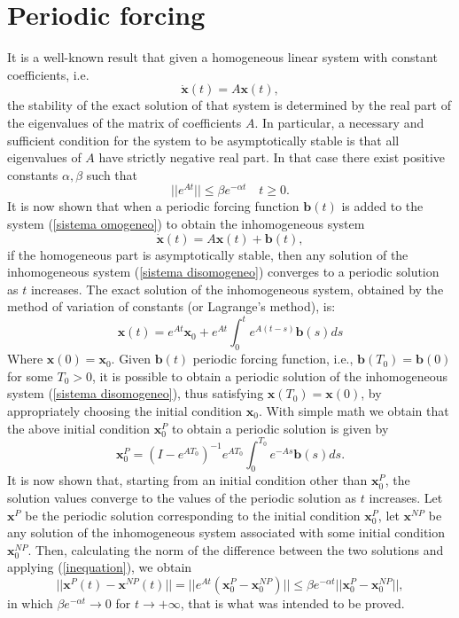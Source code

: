 \section{Periodic forcing}
It is a well-known result that given a homogeneous linear system with constant coefficients, i.e.
\begin{equation}\label{sistema omogeneo}
    \bm{\dot{x}}(t)=A\bm{x}(t),
\end{equation}
the stability of the exact solution of that system is determined by the real part of the eigenvalues of the matrix of coefficients $A$. In particular, a necessary and sufficient condition for the system to be asymptotically stable is that all eigenvalues of $A$ have strictly negative real part. In that case there exist positive constants $\alpha, \beta$ such that
\begin{equation}\label{inequation}
||e^{At}||\leq \beta e^{-\alpha t}\quad t\geq 0.    
\end{equation}
It is now shown that when a periodic forcing function $\bm{b}(t)$ is added to the system (\ref{sistema omogeneo}) to obtain the
inhomogeneous system 
\begin{equation}\label{sistema disomogeneo}
    \bm{\dot{x}}(t)=A\bm{x}(t)+\bm{b}(t),
\end{equation}
if the homogeneous part is asymptotically stable, then any solution of the inhomogeneous system (\ref{sistema disomogeneo}) converges to a periodic solution as $t$ increases. The exact solution of the inhomogeneous system, obtained by the method of variation of constants (or Lagrange's method), is:
\[
\bm{x}(t)=e^{At}\bm{x}_0+e^{At}\int_0^t e^{A(t-s)}\bm{b}(s)ds
\]
Where $\bm{x}(0)= \bm{x}_0$. Given $\bm{b}(t)$ periodic forcing function, i.e., $\bm{b}(T_0) = \bm{b}(0)$ for some $T_0 > 0$, it is possible to obtain a periodic solution of the inhomogeneous system (\ref{sistema disomogeneo}), thus satisfying $\bm{x}(T_0) = \bm{x}(0)$, by appropriately choosing the initial condition $\bm{x}_0$. With simple math we obtain that the above initial condition $\bm{x}^P_0$ to obtain a periodic solution is given by
\[
\bm{x}_0^P=(I-e^{AT_0})^{-1} e^{AT_0}\int_0^{T_0} e^{-As}\bm{b}(s)ds.
\]
It is now shown that, starting from an initial condition other than $\bm{x}^P_0$, the solution values converge to the values of the periodic solution as $t$ increases. Let $\bm{x}^P$ be the periodic solution corresponding to the initial condition $\bm{x}^P_0$, let $\bm{x}^{NP}$ be any solution of the inhomogeneous system associated with some initial condition $\bm{x}_0^{NP}$. Then, calculating the norm of the difference between the two solutions and applying (\ref{inequation}), we obtain
\[
||\bm{x}^P(t)-\bm{x}^{NP}(t)||=||e^{At}(\bm{x}_0^P-\bm{x}_0^{NP})||\leq \beta e^{-\alpha t} ||\bm{x}_0^P-\bm{x}_0^{NP}||,
\]
in which $\beta e^{-\alpha t}\rightarrow 0$ for $t\rightarrow +\infty$, that is what was intended to be proved. 


